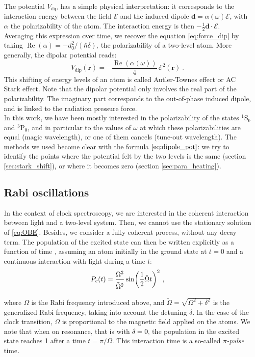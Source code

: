 \documentclass[11pt]{article}
\numberwithin{equation}{section}
\numberwithin{figure}{section}
\begin{document}
The potential $V_\text{dip}$ has a simple physical interpretation: it corresponds to the interaction energy between the field $\bm{\mathcal{E}}$ and the induced dipole $\mathbf{d} = \alpha(\omega) \bm{\mathcal{E}}$, with $\alpha$ the polarizability of the atom. The interaction energy is then $- \frac{1}{2} \mathbf{d}\cdot \bm{\mathcal{E}}$. Averaging this expression over time, we recover the equation \eqref{eq:force_dip} by taking $\operatorname{Re}(\alpha) = -d_0^2 /(\hbar \delta)$, the polarizability of a two-level atom. More generally, the dipolar potential reads:
%
\begin{equation}
	\label{eq:dipole_pot}
	V_\text{dip}(\mathbf{r}) = -\frac{\operatorname{Re}(\alpha(\omega))}{4} \, \mathcal{E}^2 (\mathbf{r})~.
\end{equation}
%
This shifting of energy levels of an atom is called Autler-Townes effect or AC Stark effect. 
Note that the dipolar potential only involves the real part of the polarizability. The imaginary part corresponds to the out-of-phase induced dipole, and is linked to the radiation pressure force. \\

In this work, we have been mostly interested in the polarizability of the states $^1$S$_0$ and $^3$P$_0$, and in particular to the values of $\omega$ at which these polarizabilities are equal (magic wavelength), or one of them cancels (tune-out wavelength). The methods we used become clear with the formula $\eqref{eq:dipole_pot}$: we try to identify the points where the potential felt by the two levels is the same (section \ref{sec:stark_shift}), or where it becomes zero (section \ref{sec:para_heating}).

\subsection{Rabi oscillations}
\label{sec:rabi_theory}

In the context of clock spectroscopy, we are interested in the coherent interaction between light and a two-level system. Then, we cannot use the stationary solution of \eqref{eq:OBE}. Besides, we consider a fully coherent process, without any decay term. The population of the excited state can then be written explicitly as a function of time \citep[see for instance][eq. 5.60]{2021_steck}, assuming an atom initially in the ground state at $t=0$ and a continuous interaction with light during a time $t$: 
%
\begin{equation}
	P_e(t) = \frac{\Omega^2}{\vphantom{\Big(}\tilde{\Omega}^2} \sin(\frac{1}{2}\tilde{\Omega}t)^2~,
\end{equation}
%
where $\Omega$ is the Rabi frequency introduced above, and $\tilde{\Omega} = \sqrt{\Omega^2 + \delta^2}$ is the generalized Rabi frequency, taking into account the detuning $\delta$. In the case of the clock transition, $\Omega$ is proportional to the magnetic field applied on the atoms. We note that when on resonance, that is with $\delta=0$, the population in the excited state reaches 1 after a time $t = \pi/\Omega$. This interaction time is a so-called \emph{$\pi$-pulse} time.
\end{document}
